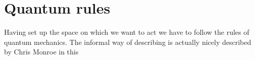\section{Quantum rules}
Having set up the space on which we want to act we have to follow the rules of quantum mechanics. The informal way of describing is actually nicely described by Chris Monroe in this 